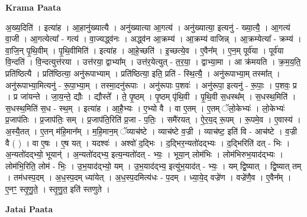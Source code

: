 \documentclass[17pt]{extarticle}
\begin{document}
\textbf{Krama Paata} \newline

अ॒ख्य॒दिति॑ । इत्या॑ह । आ॒हानु॑ख्यात्यै । अनु॑ख्यात्या आ॒गत्य॑ । अनु॑ख्यात्या॒ इत्यनु॑ - ख्या॒त्यै॒ । आ॒गत्य॑ वा॒जी । आ॒गत्येत्या᳚ - गत्य॑ । वा॒ज्यद्ध्व॑नः । अद्ध्व॑न आ॒क्रम्य॑ । आ॒क्रम्य॑ वाजिन्न् । आ॒क्रम्येत्या᳚ - क्रम्य॑ । वा॒जि॒न् पृ॒थि॒वीम् । पृ॒थि॒वीमिति॑ । इत्या॑ह । आ॒हे॒च्छति॑ । इ॒च्छत्ये॒व । ए॒वैन᳚म् । ए॒न॒म् पूर्व॑या । पूर्व॑या वि॒न्दति॑ । वि॒न्दत्युत्त॑रया । उत्त॑रया॒ द्वाभ्या᳚म् । उत्त॑र॒येत्युत् - त॒र॒या॒ । द्वाभ्या॒मा । 
आ क्र॑मयति । क्र॒म॒य॒ति॒ प्रति॑ष्ठित्यै । प्रति॑ष्ठित्या॒ अनु॑रूपाभ्याम् । प्रति॑ष्ठित्या॒ इति॒ प्रति॑ - स्थि॒त्यै॒ । अनु॑रूपाभ्या॒म् तस्मा᳚त् । अनु॑रूपाभ्या॒मित्यनु॑ - रू॒पा॒भ्या॒म् । तस्मा॒दनु॑रूपाः । अनु॑रूपाः प॒शवः॑ । अनु॑रूपा॒ इत्यनु॑ - रू॒पाः॒ । प॒शवः॒ प्र । प्र जा॑यन्ते । जा॒य॒न्ते॒ द्यौः । द्यौस्ते᳚ । ते॒ पृ॒ष्ठम् । पृ॒ष्ठम् पृ॑थि॒वी । पृ॒थि॒वी स॒धस्थ᳚म् । स॒धस्थ॒मिति॑ । स॒धस्थ॒मिति॑ स॒ध - स्थ॒म् । इत्या॑ह । आ॒है॒भ्यः । ए॒भ्यो वै । वा ए॒तम् । ए॒तम् ॅलो॒केभ्यः॑ । लो॒केभ्यः॑ प्र॒जाप॑तिः । प्र॒जाप॑तिः॒ सम् । प्र॒जाप॑ति॒रिति॑ प्र॒जा - प॒तिः॒ । समै॑रयत् । ऐ॒र॒य॒द् रू॒पम् । रू॒पमे॒व । ए॒वास्य॑ । अ॒स्यै॒तत् । ए॒तन् म॑हि॒मान᳚म् । म॒हि॒मान॒म् ॅव्याच॑ष्टे । व्याच॑ष्टे व॒ज्री । व्याच॑ष्ट॒ इति॑ वि - आच॑ष्टे । व॒ज्री वै ( ) । वा ए॒षः । ए॒ष यत् । यदश्वः॑ । अश्वो॑ द॒द्भिः । द॒द्भिर॒न्यतो॑दद्भ्यः । द॒द्भिरिति॑ दत् - भिः । अ॒न्यतो॑दद्भ्यो॒ भूयान्॑ । अ॒न्यतो॑दद्भ्य॒ इत्य॒न्यतो॑दत् - भ्यः॒ । भूया॒न् लोम॑भिः । लोम॑भिरुभ॒याद॑द्भ्यः । लोम॑भि॒रिति॒ लोम॑ - भिः॒ । उ॒भ॒याद॑द्भ्यो॒ यम् । उ॒भ॒याद॑द्भ्य॒ इत्यु॑भ॒याद॑त् - भ्यः॒ । यम् द्वि॒ष्यात् । द्वि॒ष्यात् तम् । तम॑धस्प॒दम् । अ॒ध॒स्प॒दम् ध्या॑येत् । अ॒ध॒स्प॒दमित्य॑धः - प॒दम् । ध्या॒ये॒द् वज्रे॑ण । वज्रे॑णै॒व । ए॒वैन᳚म् । ए॒नꣳ॒॒ स्तृ॒णु॒ते॒ । स्तृ॒णु॒त॒ इति॑ स्तणुते । \newline

\textbf{Jatai Paata} \newline
\end{document}

